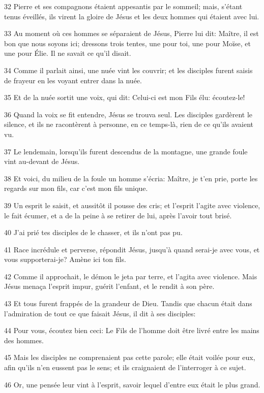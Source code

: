 \par 32 Pierre et ses compagnons étaient appesantis par le sommeil; mais, s'étant tenus éveillés, ils virent la gloire de Jésus et les deux hommes qui étaient avec lui.
\par 33 Au moment où ces hommes se séparaient de Jésus, Pierre lui dit: Maître, il est bon que nous soyons ici; dressons trois tentes, une pour toi, une pour Moïse, et une pour Élie. Il ne savait ce qu'il disait.
\par 34 Comme il parlait ainsi, une nuée vint les couvrir; et les disciples furent saisis de frayeur en les voyant entrer dans la nuée.
\par 35 Et de la nuée sortit une voix, qui dit: Celui-ci est mon Fils élu: écoutez-le!
\par 36 Quand la voix se fit entendre, Jésus se trouva seul. Les disciples gardèrent le silence, et ils ne racontèrent à personne, en ce temps-là, rien de ce qu'ils avaient vu.
\par 37 Le lendemain, lorsqu'ils furent descendus de la montagne, une grande foule vint au-devant de Jésus.
\par 38 Et voici, du milieu de la foule un homme s'écria: Maître, je t'en prie, porte les regards sur mon fils, car c'est mon fils unique.
\par 39 Un esprit le saisit, et aussitôt il pousse des cris; et l'esprit l'agite avec violence, le fait écumer, et a de la peine à se retirer de lui, après l'avoir tout brisé.
\par 40 J'ai prié tes disciples de le chasser, et ils n'ont pas pu.
\par 41 Race incrédule et perverse, répondit Jésus, jusqu'à quand serai-je avec vous, et vous supporterai-je? Amène ici ton fils.
\par 42 Comme il approchait, le démon le jeta par terre, et l'agita avec violence. Mais Jésus menaça l'esprit impur, guérit l'enfant, et le rendit à son père.
\par 43 Et tous furent frappés de la grandeur de Dieu. Tandis que chacun était dans l'admiration de tout ce que faisait Jésus, il dit à ses disciples:
\par 44 Pour vous, écoutez bien ceci: Le Fils de l'homme doit être livré entre les mains des hommes.
\par 45 Mais les disciples ne comprenaient pas cette parole; elle était voilée pour eux, afin qu'ils n'en eussent pas le sens; et ils craignaient de l'interroger à ce sujet.
\par 46 Or, une pensée leur vint à l'esprit, savoir lequel d'entre eux était le plus grand.

